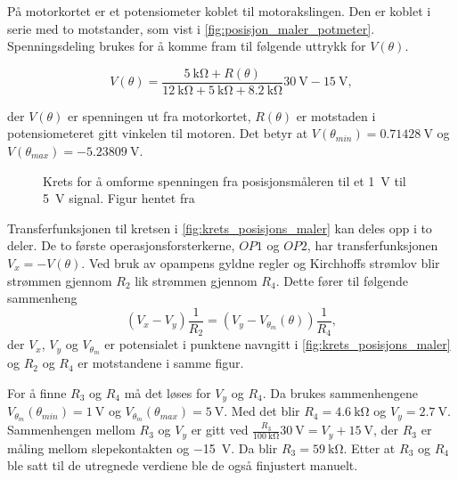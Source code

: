 På motorkortet er et potensiometer koblet til motorakslingen. Den er koblet i serie med to motstander, som vist i \autoref{fig:posisjon_maler_potmeter}. Spenningsdeling brukes for å komme fram til følgende uttrykk for $V(\theta)$.

\begin{equation}
    \label{eq:V_av_theta}
    V(\theta) = \frac{\SI{5}{\kilo\ohm} + R(\theta)}{\SI{12}{\kilo\ohm} + \SI{5}{\kilo\ohm} + \SI{8.2}{\kilo\ohm}} \SI{30}{\volt} - \SI{15}{\volt},
\end{equation}

der $V(\theta)$ er spenningen ut fra motorkortet, $R(\theta)$ er motstaden i potensiometeret gitt vinkelen til motoren. Det betyr at $V(\theta_{min}) = \SI{0.71428}{\volt}$ og $V(\theta_{max}) =\SI{-5.23809}{\volt}$. 

\begin{figure}[h]
    \centering
    
    \caption{Krets for å omforme spenningen fra posisjonsmåleren til et \SI{1}{\volt} til \SI{5}{\volt} signal. Figur hentet fra \cite{AnalogMotorlabbOppgaver}}
    \label{fig:krets_posisjons_maler}
\end{figure}

Transferfunksjonen til kretsen i \autoref{fig:krets_posisjons_maler} kan deles opp i to deler. De to første operasjonsforsterkerne, $OP1$ og $OP2$, har transferfunksjonen $V_x = -V(\theta)$. Ved bruk av opampens gyldne regler og Kirchhoffs strømlov blir strømmen gjennom $R_2$ lik strømmen gjennom $R_4$. Dette fører til følgende sammenheng
\begin{equation}
    \label{eq:posisjonmåler_skalering}
    (V_x - V_y) \frac{1}{R_2} = (V_y - V_{\theta_m}(\theta)) \frac{1}{R_4},
\end{equation}
der $V_x$, $V_y$ og $V_{\theta_m}$ er potensialet i punktene navngitt i \autoref{fig:krets_posisjons_maler} og $R_2$ og $R_4$ er motstandene i samme figur.


For å finne $R_3$ og $R_4$ må det løses for $V_y$ og $R_4$. Da brukes sammenhengene $V_{\theta_m}(\theta_{min}) = \SI{1}{\volt}$ og $V_{\theta_m}(\theta_{max}) = \SI{5}{\volt}$. Med det blir $R_4 = \SI{4.6}{\kilo\ohm}$ og 
$V_y = \SI{2.7}{\volt}$. Sammenhengen mellom $R_3$ og $V_y$ er gitt ved $\frac{R_3}{\SI{100}{\kilo\ohm}} \SI{30}{\volt} = V_y + \SI{15}{\volt}$, der $R_3$ er måling mellom slepekontakten og \SI{-15}{\volt}. Da blir $R_3 = \SI{59}{\kilo\ohm}$. Etter at $R_3$ og $R_4$ ble satt til de utregnede verdiene ble de også finjustert manuelt.

